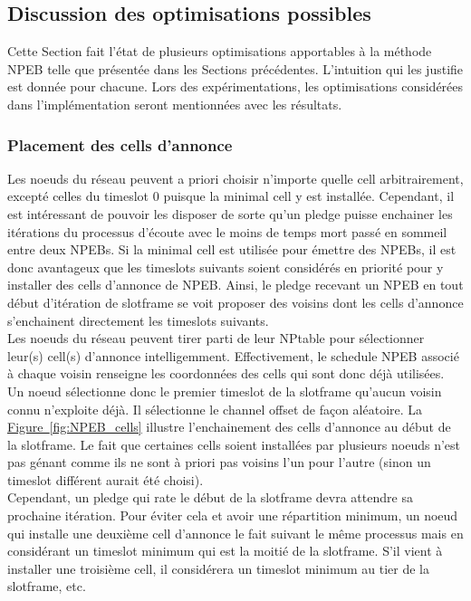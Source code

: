 \documentclass[]{report}
\newcommand{\wordlink}[2]{\hyperref[#2]{#1~\ref{#2}}}
\begin{document}
\subsection{Discussion des optimisations possibles}

Cette Section fait l'état de plusieurs optimisations apportables à la méthode NPEB telle que présentée dans les Sections précédentes. L'intuition qui les justifie est donnée pour chacune. Lors des expérimentations, les optimisations considérées dans l'implémentation seront mentionnées avec les résultats.

\subsubsection{Placement des cells d'annonce}

Les noeuds du réseau peuvent a priori choisir n'importe quelle cell arbitrairement, excepté celles du timeslot 0 puisque la minimal cell y est installée. Cependant, il est intéressant de pouvoir les disposer de sorte qu'un pledge puisse enchainer les itérations du processus d'écoute avec le moins de temps mort passé en sommeil entre deux NPEBs. Si la minimal cell est utilisée pour émettre des NPEBs, il est donc avantageux que les timeslots suivants soient considérés en priorité pour y installer des cells d'annonce de NPEB. Ainsi, le pledge recevant un NPEB en tout début d'itération de slotframe se voit proposer des voisins dont les cells d'annonce s'enchainent directement les timeslots suivants.\\

Les noeuds du réseau peuvent tirer parti de leur NPtable pour sélectionner leur(s) cell(s) d'annonce intelligemment. Effectivement, le schedule NPEB associé à chaque voisin renseigne les coordonnées des cells qui sont donc déjà utilisées. Un noeud sélectionne donc le premier timeslot de la slotframe qu'aucun voisin connu n'exploite déjà. Il sélectionne le channel offset de façon aléatoire. La \wordlink{Figure}{fig:NPEB_cells} illustre l'enchainement des cells d'annonce au début de la slotframe. Le fait que certaines cells soient installées par plusieurs noeuds n'est pas génant comme ils ne sont à priori pas voisins l'un pour l'autre (sinon un timeslot différent aurait été choisi).\\

Cependant, un pledge qui rate le début de la slotframe devra attendre sa prochaine itération. Pour éviter cela et avoir une répartition minimum, un noeud qui installe une deuxième cell d'annonce le fait suivant le même processus mais en considérant un timeslot minimum qui est la moitié de la slotframe. S'il vient à installer une troisième cell, il considérera un timeslot minimum au tier de la slotframe, etc.
\end{document}
